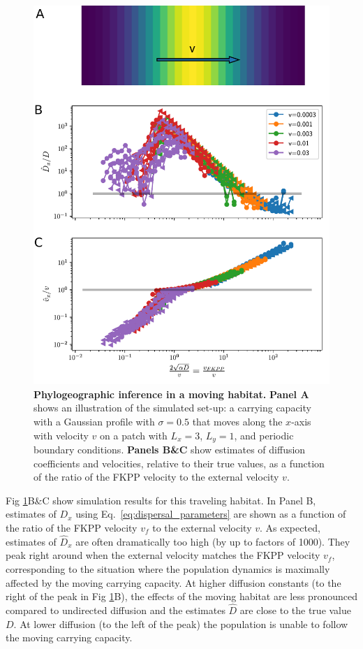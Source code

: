 \documentclass[aps,rmp, twocolumn]{revtex4}
\newcommand{\vfkpp}{v_f}
\begin{document}
\begin{figure}[tb]
    \includegraphics[width=\columnwidth]{figures/Fig5}
    \caption{\label{fig:traveling_wave}{\bf Phylogeographic inference in a moving habitat.}
    {\bf Panel A} shows an illustration of the simulated set-up: a carrying capacity with a Gaussian profile with $\sigma=0.5$ that moves along the $x$-axis with velocity $v$ on a patch with $L_x=3$, $L_y=1$, and periodic boundary conditions.
    {\bf Panels B\&C} show estimates of diffusion coefficients and velocities, relative to their true values, as a function of the ratio of the FKPP velocity to the external velocity $v$. }
\end{figure}


Fig \ref{fig:traveling_wave}B\&C show simulation results for this traveling habitat. In Panel B, estimates of $D_x$ using Eq.~\ref{eq:dispersal_parameters} are shown as a function of the ratio of the FKPP velocity $v_f$ to the external velocity $v$.
As expected, estimates of $\hat{D}_x$ are often dramatically too high (by up to factors of 1000).
They peak right around when the external velocity matches the FKPP velocity $\vfkpp$, corresponding to the situation where the population dynamics is maximally affected by the moving carrying capacity.
At higher diffusion constants (to the right of the peak in Fig \ref{fig:traveling_wave}B), the effects of the moving habitat are less pronounced compared to undirected diffusion and the estimates $\hat{D}$ are close to the true value $D$.
At lower diffusion (to the left of the peak) the population is unable to follow the moving carrying capacity.
\end{document}

